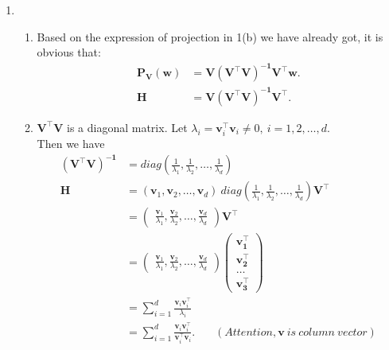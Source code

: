 \documentclass[11pt,letter,notitlepage]{article}
\newcommand{\proj}[2]{\textbf{P}_{#2} (#1)}
\begin{document}
\begin{solution}
\begin{enumerate}
\begin{enumerate}
				\item
				\begin{enumerate}
					\item
					Based on the expression of projection in 1(b) we have already got, it is obvious that:
					\begin{align*}
						\proj{\mathbf{w}}{\mathbf{V}}&=
						\mathbf{V(V^{\top}V)^{-1}V^{\top}w}.\\
						\mathbf{H}&=\mathbf{V(V^{\top}V)^{-1}V^{\top}}.
					\end{align*}
					
					\item
					$\mathbf{V^\top V}$ is a diagonal matrix. Let $\lambda_i=\mathbf{v}_i^\top\mathbf{v}_i\neq 0,~ i=1,2,\dots,d.$\\
					Then we have 
					\begin{align*}
						\mathbf{(V^\top V)^{-1}}&=diag(\frac{1}{\lambda_1},\frac{1}{\lambda_2},\dots,\frac{1}{\lambda_d})\\
						\mathbf{H}
						&=(\mathbf{v}_1,\mathbf{v}_2,\dots,\mathbf{v}_d)~diag(\frac{1}{\lambda_1},\frac{1}{\lambda_2},\dots,\frac{1}{\lambda_d})\mathbf{V^\top}\\
						&=\begin{pmatrix}\frac{\mathbf{v}_1}{\lambda_1},\frac{\mathbf{v}_2}{\lambda_2},\dots,\frac{\mathbf{v}_d}{\lambda_d}\end{pmatrix}\mathbf{V^\top}\\
						&=\begin{pmatrix}
							\frac{\mathbf{v}_1}{\lambda_1},\frac{\mathbf{v}_2}{\lambda_2},\dots,\frac{\mathbf{v}_d}{\lambda_d}
						\end{pmatrix}
						\begin{pmatrix}
							\mathbf{v_1^\top}\\
							\mathbf{v_2^\top}\\
							\dots\\
							\mathbf{v_3^\top}
						\end{pmatrix}\\
						&=\sum_{i=1}^d{\frac{\mathbf{v}_i\mathbf{v}_i^\top}{\lambda_i}}\\
						&=\sum_{i=1}^d{\frac{\mathbf{v}_i\mathbf{v}_i^\top}{\mathbf{v}_i^\top\mathbf{v}_i}}. ~~~~~~~~(Attention, \mathbf{v}~is~column~vector)
					\end{align*}
			\end{enumerate}
			

\end{enumerate}
\end{enumerate}
\end{solution}
\end{document}
